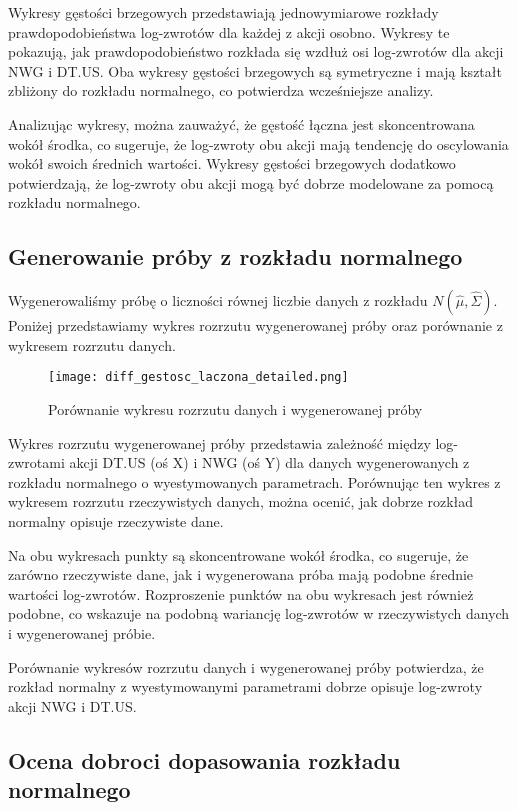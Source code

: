\documentclass[a4paper,11pt]{article}
\begin{document}
Wykresy gęstości brzegowych przedstawiają jednowymiarowe rozkłady prawdopodobieństwa log-zwrotów dla każdej z akcji osobno. Wykresy te pokazują, jak prawdopodobieństwo rozkłada się wzdłuż osi log-zwrotów dla akcji NWG i DT.US. Oba wykresy gęstości brzegowych są symetryczne i mają kształt zbliżony do rozkładu normalnego, co potwierdza wcześniejsze analizy.

Analizując wykresy, można zauważyć, że gęstość łączna jest skoncentrowana wokół środka, co sugeruje, że log-zwroty obu akcji mają tendencję do oscylowania wokół swoich średnich wartości. Wykresy gęstości brzegowych dodatkowo potwierdzają, że log-zwroty obu akcji mogą być dobrze modelowane za pomocą rozkładu normalnego.

\subsection{Generowanie próby z rozkładu normalnego}
Wygenerowaliśmy próbę o liczności równej liczbie danych z rozkładu \(N(\hat{\mu}, \hat{\Sigma})\). Poniżej przedstawiamy wykres rozrzutu wygenerowanej próby oraz porównanie z wykresem rozrzutu danych.

\begin{figure}[h]
\centering
\texttt{[image: diff\_gestosc\_laczona\_detailed.png]}
\caption{Porównanie wykresu rozrzutu danych i wygenerowanej próby}
\end{figure}

Wykres rozrzutu wygenerowanej próby przedstawia zależność między log-zwrotami akcji DT.US (oś X) i NWG (oś Y) dla danych wygenerowanych z rozkładu normalnego o wyestymowanych parametrach. Porównując ten wykres z wykresem rozrzutu rzeczywistych danych, można ocenić, jak dobrze rozkład normalny opisuje rzeczywiste dane.

Na obu wykresach punkty są skoncentrowane wokół środka, co sugeruje, że zarówno rzeczywiste dane, jak i wygenerowana próba mają podobne średnie wartości log-zwrotów. Rozproszenie punktów na obu wykresach jest również podobne, co wskazuje na podobną wariancję log-zwrotów w rzeczywistych danych i wygenerowanej próbie.

Porównanie wykresów rozrzutu danych i wygenerowanej próby potwierdza, że rozkład normalny z wyestymowanymi parametrami dobrze opisuje log-zwroty akcji NWG i DT.US.


\subsection{Ocena dobroci dopasowania rozkładu normalnego}
\end{document}
